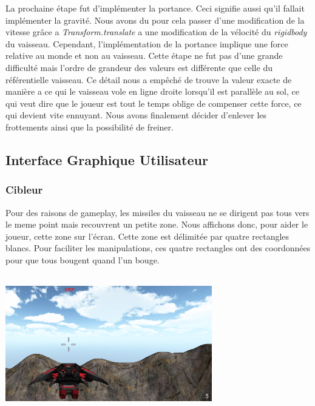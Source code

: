\documentclass[10pt, titlepage]{report}
\begin{document}
La prochaine étape fut d'implémenter la portance. Ceci signifie aussi qu'il fallait implémenter la gravité. Nous avons du pour cela passer d'une modification de la vitesse grâce a \textit{Transform.translate} a une modification de la vélocité du \textit{rigidbody} du vaisseau. Cependant, l'implémentation de la portance implique une force relative au monde et non au vaisseau. Cette étape ne fut pas d'une grande difficulté mais l'ordre de grandeur des valeurs est différente que celle du référentielle vaisseau. Ce détail nous a empêché de trouve la valeur exacte de manière a ce qui le vaisseau vole en ligne droite lorsqu'il est parallèle au sol, ce qui veut dire que le joueur est tout le temps oblige de compenser cette force, ce qui devient vite ennuyant. Nous avons finalement décider d'enlever les frottements ainsi que la possibilité de freiner.\\

\subsection{Interface Graphique  Utilisateur}

\subsubsection{Cibleur}
 Pour des raisons de gameplay, les missiles du vaisseau ne se dirigent pas tous vers le meme point mais recouvrent un petite zone. Nous affichons donc, pour aider le joueur, cette zone sur l'écran. Cette zone est délimitée par quatre rectangles blancs. Pour faciliter les manipulations, ces quatre rectangles ont des coordonnées pour que tous bougent quand l'un bouge. \\

\begin{center}
\includegraphics[height=6cm, width=9cm]{Capture_rebut.PNG}
\end{center}
\end{document}

